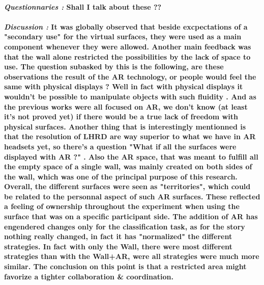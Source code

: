     \paragraph{ \textit{Questionnaries :}
                \newline
                \indent \indent \textnormal{Shall I talk about these ??}}
    
    \paragraph{ \textit{Discussion :} 
                \newline
                \indent \indent \textnormal{It was globally observed that beside excpectations of a "secondary use" for the virtual surfaces, they were used as a main component whenever they were 
                allowed. Another main feedback was that the wall alone restricted the possibilities by the lack of space to use. The question subasked by this is the following, are these observations 
                the result of the AR technology, or people would feel the same with physical displays ? Well in fact with physical displays it wouldn't be possible to manipulate objects with such fluidity
                . And as the previous works were all focused on AR, we don't know (at least it's not proved yet) if there would be a true lack of freedom with physical surfaces. Another thing that is interestingly
                mentionned is that the resolution of LHRD are way superior to what we have in AR headsets yet, so there's a question "What if all the surfaces were displayed with AR ?" .}
                \newline
                \indent \indent \textnormal{Also the AR space, that was meant to fulfill all the empty space of a single wall, was mainly created on both sides of the wall, which was one of the principal purpose of this research.
                Overall, the different surfaces were seen as "territories", which could be related to the personnal aspect of such AR surfaces. These reflected a feeling of ownership throughout the experiment when using the surface
                that was on a specific participant side.}
                \newline
                \indent \indent \textnormal{The addition of AR has engendered changes only for the classification task, as for the story nothing really changed, in fact it has "normalized" the different strategies. In fact with only 
                the Wall, there were most different strategies than with the Wall+AR, were all strategies were much more similar. The conclusion on this point is that a restricted area might favorize a tighter collaboration \& coordination.}
}
